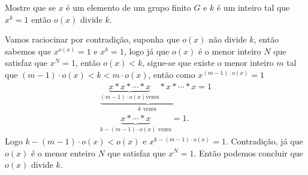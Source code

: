 \begin{homeworkProblem}
  Mostre que se $x$ é um elemento de um grupo finito $G$ e $k$ é um inteiro tal que $x^k = 1$ então $o(x)$ divide $k$.
  \begin{solution}
    Vamos raciocinar por contradição, suponha que $o(x)$ não divide $k$, então sabemos que $x^{o(x)}=1$ e $x^{k}=1$, logo já que $o(x)$ é o menor inteiro $N$ que satisfaz que $x^{N}=1$, então $o(x)<k$, sigue-se que existe o menor inteiro $m$ tal que $(m-1)\cdot o(x)<k<m\cdot o(x)$, então como $x^{(m-1)\cdot o(x)}=1$
    \begin{align*}
      \underbrace{\underbrace{x*x*\cdots*x}_{(m-1)\cdot o(x)\text{vezes}}*x*\cdots*x}_{k\text{ vezes }}=1\\
      \underbrace{x*\cdots*x}_{k-(m-1)\cdot o(x)\text{ vezes}}=1.
    \end{align*}
    Logo $k-(m-1)\cdot o(x)< o(x)$ e $x^{k-(m-1)\cdot o(x)}=1$. Contradição, já que $o(x)$ é o menor enteiro $N$ que satisfaz que $x^N=1$. Então podemos concluir que $o(x)$ divide $k$.  
  \end{solution}
\end{homeworkProblem}
